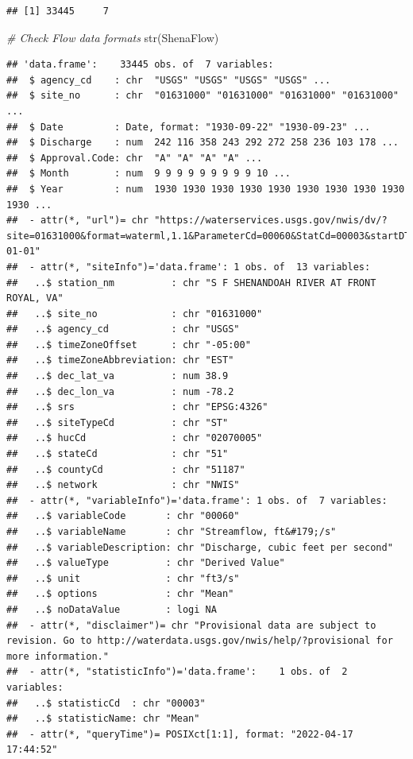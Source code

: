 \documentclass[
  12pt,
]{article}
\newenvironment{Shaded}{\begin{snugshade}}{\end{snugshade}}
\newcommand{\CommentTok}[1]{\textcolor[rgb]{0.56,0.35,0.01}{\textit{#1}}}
\newcommand{\FunctionTok}[1]{\textcolor[rgb]{0.00,0.00,0.00}{#1}}
\newcommand{\NormalTok}[1]{#1}
\begin{document}
\begin{verbatim}
## [1] 33445     7
\end{verbatim}

\begin{Shaded}
\begin{Highlighting}[]
\CommentTok{\# Check Flow data formats}
\FunctionTok{str}\NormalTok{(ShenaFlow)}
\end{Highlighting}
\end{Shaded}

\begin{verbatim}
## 'data.frame':    33445 obs. of  7 variables:
##  $ agency_cd    : chr  "USGS" "USGS" "USGS" "USGS" ...
##  $ site_no      : chr  "01631000" "01631000" "01631000" "01631000" ...
##  $ Date         : Date, format: "1930-09-22" "1930-09-23" ...
##  $ Discharge    : num  242 116 358 243 292 272 258 236 103 178 ...
##  $ Approval.Code: chr  "A" "A" "A" "A" ...
##  $ Month        : num  9 9 9 9 9 9 9 9 9 10 ...
##  $ Year         : num  1930 1930 1930 1930 1930 1930 1930 1930 1930 1930 ...
##  - attr(*, "url")= chr "https://waterservices.usgs.gov/nwis/dv/?site=01631000&format=waterml,1.1&ParameterCd=00060&StatCd=00003&startDT=1851-01-01"
##  - attr(*, "siteInfo")='data.frame': 1 obs. of  13 variables:
##   ..$ station_nm          : chr "S F SHENANDOAH RIVER AT FRONT ROYAL, VA"
##   ..$ site_no             : chr "01631000"
##   ..$ agency_cd           : chr "USGS"
##   ..$ timeZoneOffset      : chr "-05:00"
##   ..$ timeZoneAbbreviation: chr "EST"
##   ..$ dec_lat_va          : num 38.9
##   ..$ dec_lon_va          : num -78.2
##   ..$ srs                 : chr "EPSG:4326"
##   ..$ siteTypeCd          : chr "ST"
##   ..$ hucCd               : chr "02070005"
##   ..$ stateCd             : chr "51"
##   ..$ countyCd            : chr "51187"
##   ..$ network             : chr "NWIS"
##  - attr(*, "variableInfo")='data.frame': 1 obs. of  7 variables:
##   ..$ variableCode       : chr "00060"
##   ..$ variableName       : chr "Streamflow, ft&#179;/s"
##   ..$ variableDescription: chr "Discharge, cubic feet per second"
##   ..$ valueType          : chr "Derived Value"
##   ..$ unit               : chr "ft3/s"
##   ..$ options            : chr "Mean"
##   ..$ noDataValue        : logi NA
##  - attr(*, "disclaimer")= chr "Provisional data are subject to revision. Go to http://waterdata.usgs.gov/nwis/help/?provisional for more information."
##  - attr(*, "statisticInfo")='data.frame':    1 obs. of  2 variables:
##   ..$ statisticCd  : chr "00003"
##   ..$ statisticName: chr "Mean"
##  - attr(*, "queryTime")= POSIXct[1:1], format: "2022-04-17 17:44:52"
\end{verbatim}
\end{document}
